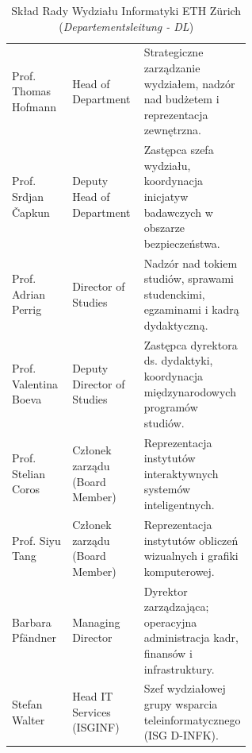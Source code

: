 \begin{table}[H]
    \centering
    \caption{Skład Rady Wydziału Informatyki ETH Zürich (\textit{Departementsleitung - DL})}\label{tab:wladze-dinfk}
    \tablefont
    \begin{tabularx}{\linewidth}{L{0.28\linewidth} L{0.32\linewidth} Y}
        \toprule
         &  &  \\
        \midrule
        Prof. Thomas Hofmann & Head of Department & Strategiczne zarządzanie wydziałem, nadzór nad budżetem i reprezentacja zewnętrzna. \\
        Prof. Srdjan Čapkun & Deputy Head of Department & Zastępca szefa wydziału, koordynacja inicjatyw badawczych w obszarze bezpieczeństwa. \\
        Prof. Adrian Perrig & Director of Studies & Nadzór nad tokiem studiów, sprawami studenckimi, egzaminami i kadrą dydaktyczną. \\
        Prof. Valentina Boeva & Deputy Director of Studies & Zastępca dyrektora ds. dydaktyki, koordynacja międzynarodowych programów studiów. \\
        Prof. Stelian Coros & Członek zarządu (Board Member) & Reprezentacja instytutów interaktywnych systemów inteligentnych. \\
        Prof. Siyu Tang & Członek zarządu (Board Member) & Reprezentacja instytutów obliczeń wizualnych i grafiki komputerowej. \\
        Barbara Pfändner & Managing Director & Dyrektor zarządzająca; operacyjna administracja kadr, finansów i infrastruktury. \\
        Stefan Walter & Head IT Services (ISGINF) & Szef wydziałowej grupy wsparcia teleinformatycznego (ISG D-INFK). \\
        \bottomrule
    \end{tabularx}
\end{table}


